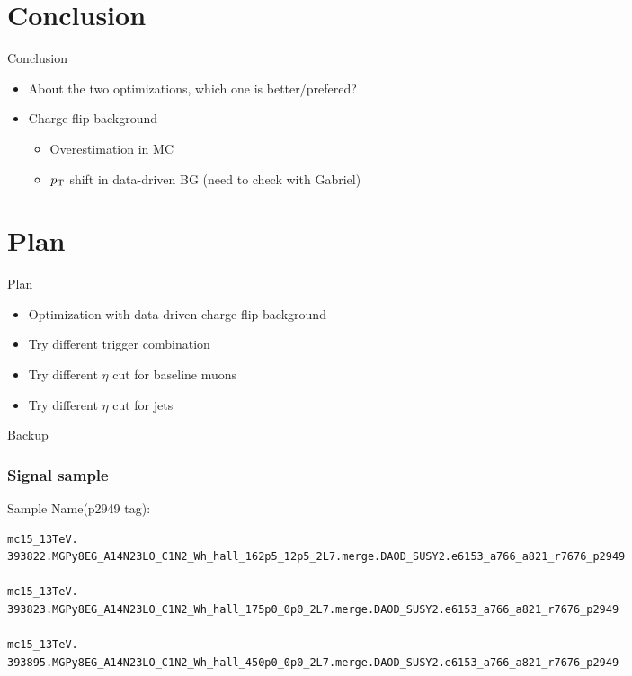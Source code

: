 \documentclass[mathserif,serif]{beamer}
\begin{document}
\section{Conclusion}
\begin{frame}{Conclusion}
\begin{itemize}
\item About the two optimizations, which one is better/prefered?
\item Charge flip background
\begin{itemize}
\item Overestimation in MC
\item $p_{\text{T}}$ shift in data-driven BG (need to check with Gabriel)
\end{itemize}
\end{itemize}
\end{frame}

\section{Plan}
\begin{frame}{Plan}
\begin{itemize}
\item Optimization with data-driven charge flip background
\item Try different trigger combination
\item Try different $\eta$ cut for baseline muons
\item Try different $\eta$ cut for jets
\end{itemize}
\end{frame}

\begin{frame}
\begin{center}
\huge
Backup
\end{center}
\end{frame}

\begin{frame}[fragile]
\frametitle{Signal sample}
\small
Sample Name(p2949 tag):
\tiny
\begin{verbatim}
mc15_13TeV.
393822.MGPy8EG_A14N23LO_C1N2_Wh_hall_162p5_12p5_2L7.merge.DAOD_SUSY2.e6153_a766_a821_r7676_p2949

mc15_13TeV.
393823.MGPy8EG_A14N23LO_C1N2_Wh_hall_175p0_0p0_2L7.merge.DAOD_SUSY2.e6153_a766_a821_r7676_p2949

mc15_13TeV.
393895.MGPy8EG_A14N23LO_C1N2_Wh_hall_450p0_0p0_2L7.merge.DAOD_SUSY2.e6153_a766_a821_r7676_p2949
\end{verbatim}
\end{frame}
\end{document}
